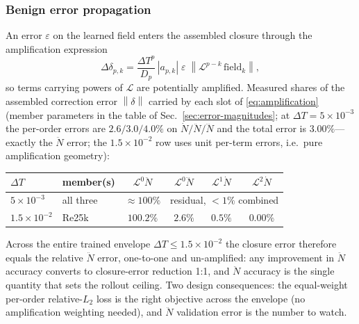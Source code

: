 \documentclass[11pt]{article}
\theoremstyle{plain}
\theoremstyle{definition}
\newcommand{\Lop}{\mathcal{L}}
\newcommand{\Ndot}{\dot{N}}
\newcommand{\Nddot}{\ddot{N}}
\newcommand{\Ndddot}{\dddot{N}}
\newcommand{\DT}{\Delta T}
\newcommand{\norm}[1]{\left\lVert #1 \right\rVert}
\begin{document}
\subsubsection{Benign error propagation}
\label{sec:benign}
An error $\varepsilon$ on the learned field enters the assembled closure
through the amplification expression
\begin{equation}
\Delta\delta_{p,k}
=\frac{\DT^p}{D_p}\,|a_{p,k}|\;\varepsilon\;
\norm{\Lop^{p-k}\,\mathrm{field}_k},
\label{eq:amplification}
\end{equation}
so terms carrying powers of $\Lop$ are potentially amplified. Measured
shares of the assembled correction error $\norm\delta$ carried by each slot
of \eqref{eq:amplification} (member parameters in the table of
Sec.~\ref{sec:error-magnitudes}; at $\DT=5\times10^{-3}$ the per-order
errors are $2.6/3.0/4.0\%$ on $\Ndot/\Nddot/\Ndddot$ and the total error is
$3.00\%$---exactly the $\Nddot$ error; the $1.5\times10^{-2}$ row uses unit
per-term errors, i.e.\ pure amplification geometry):
\begin{center}\small
\begin{tabular}{llcccc}
\toprule
$\DT$ & member(s) & $\Lop^0\Nddot$ & $\Lop^0\Ndddot$ & $\Lop^1\Ndot$ & $\Lop^2\Ndot$\\
\midrule
$5\times10^{-3}$ & all three & $\approx100\%$ &
\multicolumn{3}{c}{residual, $<1\%$ combined}\\
$1.5\times10^{-2}$ & Re25k & $100.2\%$ & $2.6\%$ & $0.5\%$ & $0.00\%$\\
\bottomrule
\end{tabular}
\end{center}
Across the entire trained envelope $\DT\le1.5\times10^{-2}$ the closure error
therefore equals the relative $\Nddot$ error, one-to-one and un-amplified:
any improvement in $\Nddot$ accuracy converts to closure-error reduction 1:1,
and $\Nddot$ accuracy is the single quantity that sets the rollout ceiling.
Two design consequences: the equal-weight per-order relative-$L_2$ loss is
the right objective across the envelope (no amplification weighting needed),
and $\Nddot$ validation error is the number to watch.

\end{document}
